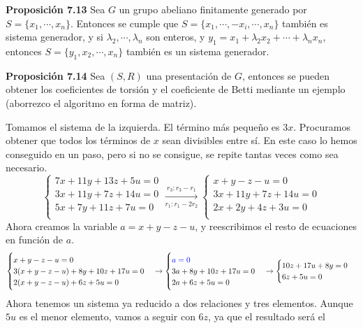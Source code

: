 \documentclass[a4paper, 11pt]{extarticle}
\newcommand{\propo}[1]{\textcolor{rojo}{\textbf{Proposición #1}}}
\begin{document}
\propo{7.13} Sea \(G\) un grupo abeliano finitamente generado por \(S = \{
x_1, \cdots, x_n \}\). Entonces se cumple que  \(S = \{ x_1, \cdots,
-x_i, \cdots, x_n\}\) también es sistema generador, y si \(\lambda _2, \cdots, \lambda _n\) son
enteros, y \(y_1 = x_1 + \lambda_2 x_2 + \cdots + \lambda _n x_n\), entonces \(S = \{
y_1, x_2, \cdots, x_n \}\) también es un sistema generador.

\propo{7.14} Sea \((S,R)\) una presentación de \(G\), entonces se pueden
obtener los coeficientes de torsión y el coeficiente de Betti mediante un ejemplo (aborrezco el 
algoritmo en forma de matriz).

Tomamos el sistema de la izquierda. El término más pequeño es \(3x\). 
Procuramos obtener que todos los términos de 
\(x\) sean divisibles entre sí. En este caso lo hemos conseguido en un paso,
pero si no se consigue, se repite tantas veces como sea necesario.
$$\begin{cases}
7x+11y+13z+5u =  0 \\ 
3x+11y+7z+14u = 0 \\ 
5x+7y+11z+7u = 0 \\ 
\end{cases} \xrightarrow[r_1:r_1-2r_2]{r_3:r_3-r_1}  
\begin{cases}
x+y-z-u =  0 \\
3x+11y+7z+14u = 0 \\
2x+2y+4z+3u = 0 \\
\end{cases}$$
Ahora creamos la variable \(a = x + y - z - u\), y reescribimos el resto de
ecuaciones en función de \(a\).
$$\begin{cases}
x+y-z-u =  0 \\ 
3(x+y-z-u)+8y+10z +17u= 0 \\ 
2(x+y-z-u) + 6z +5u = 0 \\ 
\end{cases} \rightarrow 
\begin{cases}
\textcolor{blue}{a =  0} \\ 
3a+8y+10z+17u = 0 \\ 
2a + 6z +5u = 0 \\ 
\end{cases} \rightarrow
\begin{cases} 
10z + 17u + 8y= 0 \\ 
6z +5u = 0 \\ 
\end{cases}$$
Ahora tenemos un sistema ya reducido a dos relaciones y tres elementos. Aunque \(5u\)
es el menor elemento, vamos a seguir con \(6z\), ya que el resultado será el
\end{document}
